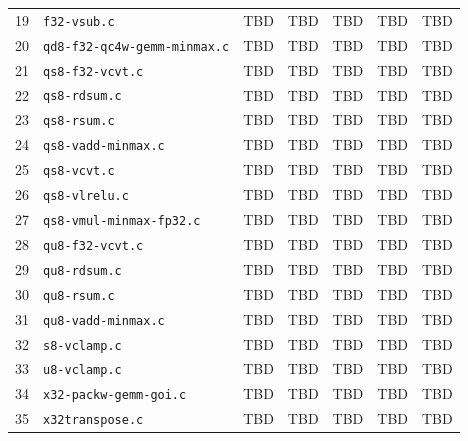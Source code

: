 {\begin{longtable}{@{}rlcrrrr@{}}
19 & \texttt{f32-vsub.c} & TBD & TBD & TBD & TBD & TBD \\
20 & \texttt{qd8-f32-qc4w-gemm-minmax.c} & TBD & TBD & TBD & TBD & TBD \\
21 & \texttt{qs8-f32-vcvt.c} & TBD & TBD & TBD & TBD & TBD \\
22 & \texttt{qs8-rdsum.c} & TBD & TBD & TBD & TBD & TBD \\
23 & \texttt{qs8-rsum.c} & TBD & TBD & TBD & TBD & TBD \\
24 & \texttt{qs8-vadd-minmax.c} & TBD & TBD & TBD & TBD & TBD \\
25 & \texttt{qs8-vcvt.c} & TBD & TBD & TBD & TBD & TBD \\
26 & \texttt{qs8-vlrelu.c} & TBD & TBD & TBD & TBD & TBD \\
27 & \texttt{qs8-vmul-minmax-fp32.c} & TBD & TBD & TBD & TBD & TBD \\
28 & \texttt{qu8-f32-vcvt.c} & TBD & TBD & TBD & TBD & TBD \\
29 & \texttt{qu8-rdsum.c} & TBD & TBD & TBD & TBD & TBD \\
30 & \texttt{qu8-rsum.c} & TBD & TBD & TBD & TBD & TBD \\
31 & \texttt{qu8-vadd-minmax.c} & TBD & TBD & TBD & TBD & TBD \\
32 & \texttt{s8-vclamp.c} & TBD & TBD & TBD & TBD & TBD \\
33 & \texttt{u8-vclamp.c} & TBD & TBD & TBD & TBD & TBD \\
34 & \texttt{x32-packw-gemm-goi.c} & TBD & TBD & TBD & TBD & TBD \\
35 & \texttt{x32transpose.c} & TBD & TBD & TBD & TBD & TBD \\
\end{longtable}
}
